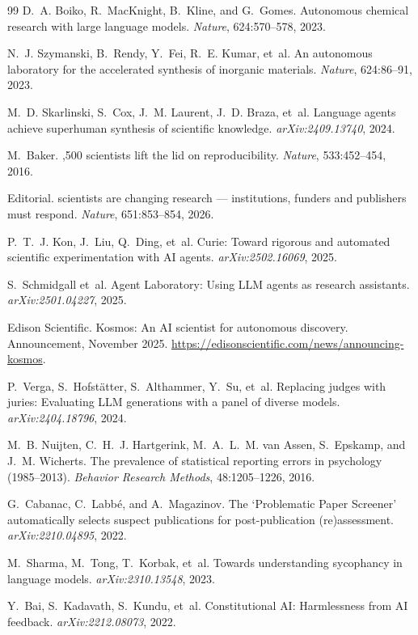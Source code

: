 \documentclass[11pt,letterpaper]{article}
\begin{document}
\begin{thebibliography}{99}
D.~A. Boiko, R.~MacKnight, B.~Kline, and G.~Gomes.
\newblock Autonomous chemical research with large language models.
\newblock \emph{Nature}, 624:570--578, 2023.

N.~J. Szymanski, B.~Rendy, Y.~Fei, R.~E. Kumar, et~al.
\newblock An autonomous laboratory for the accelerated synthesis of inorganic materials.
\newblock \emph{Nature}, 624:86--91, 2023.

M.~D. Skarlinski, S.~Cox, J.~M. Laurent, J.~D. Braza, et~al.
\newblock Language agents achieve superhuman synthesis of scientific knowledge.
\newblock \emph{arXiv:2409.13740}, 2024.

M.~Baker.
,500 scientists lift the lid on reproducibility.
\newblock \emph{Nature}, 533:452--454, 2016.

{Editorial}.
 scientists are changing research --- institutions, funders and publishers must respond.
\newblock \emph{Nature}, 651:853--854, 2026.

P.~T.~J. Kon, J.~Liu, Q.~Ding, et~al.
\newblock Curie: Toward rigorous and automated scientific experimentation with {AI} agents.
\newblock \emph{arXiv:2502.16069}, 2025.

S.~Schmidgall et~al.
\newblock Agent {Laboratory}: Using {LLM} agents as research assistants.
\newblock \emph{arXiv:2501.04227}, 2025.

{Edison Scientific}.
\newblock Kosmos: An {AI} scientist for autonomous discovery.
\newblock Announcement, November 2025.
\newblock \url{https://edisonscientific.com/news/announcing-kosmos}.

P.~Verga, S.~Hofst\"atter, S.~Althammer, Y.~Su, et~al.
\newblock Replacing judges with juries: Evaluating {LLM} generations with a panel of diverse models.
\newblock \emph{arXiv:2404.18796}, 2024.

M.~B. Nuijten, C.~H.~J. Hartgerink, M.~A.~L.~M. van Assen, S.~Epskamp, and J.~M. Wicherts.
\newblock The prevalence of statistical reporting errors in psychology (1985--2013).
\newblock \emph{Behavior Research Methods}, 48:1205--1226, 2016.

G.~Cabanac, C.~Labb\'e, and A.~Magazinov.
\newblock The `{Problematic} {Paper} {Screener}' automatically selects suspect publications for post-publication (re)assessment.
\newblock \emph{arXiv:2210.04895}, 2022.

M.~Sharma, M.~Tong, T.~Korbak, et~al.
\newblock Towards understanding sycophancy in language models.
\newblock \emph{arXiv:2310.13548}, 2023.

Y.~Bai, S.~Kadavath, S.~Kundu, et~al.
\newblock Constitutional {AI}: Harmlessness from {AI} feedback.
\newblock \emph{arXiv:2212.08073}, 2022.

\end{thebibliography}
\end{document}
